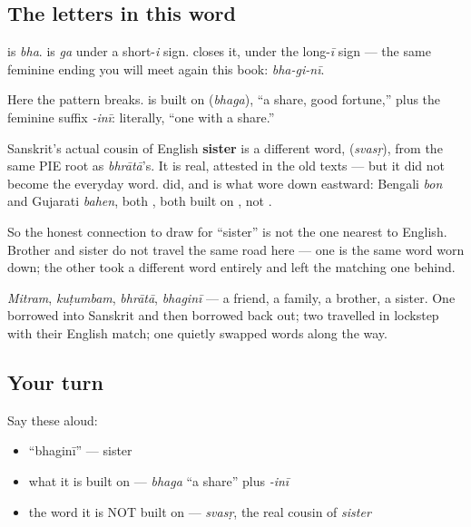 \subsection*{The letters in this word}
\textbf{} is \emph{bha}. \textbf{} is \textbf{} \emph{ga} under a short-\emph{i} sign. \textbf{} closes it, \textbf{} under the long-\emph{ī} sign — the same feminine ending you will meet again this book: \emph{bha-gi-nī}.

\begin{cousinweb}
Here the pattern breaks.  is built on \textbf{} (\emph{bhaga}), \textquotedblleft{}a share, good fortune,\textquotedblright{} plus the feminine suffix \emph{-inī}: literally, \textquotedblleft{}one with a share.\textquotedblright{}

Sanskrit's actual cousin of English \textbf{sister} is a different word, \textbf{} (\emph{svasṛ}), from the same PIE root as \emph{bhrātā}'s. It is real, attested in the old texts — but it did not become the everyday word.  did, and  is what wore down eastward: Bengali \emph{bon} and Gujarati \emph{bahen}, both , both built on , not .

So the honest connection to draw for \textquotedblleft{}sister\textquotedblright{} is not the one nearest to English. Brother and sister do not travel the same road here — one is the same word worn down; the other took a different word entirely and left the matching one behind.
\end{cousinweb}

\begin{grammarlens}[title={What you've built: four people}]
\emph{Mitram}, \emph{kuṭumbam}, \emph{bhrātā}, \emph{bhaginī} — a friend, a family, a brother, a sister. One borrowed into Sanskrit and then borrowed back out; two travelled in lockstep with their English match; one quietly swapped words along the way.
\end{grammarlens}

\subsection*{Your turn}
Say these aloud:

\begin{itemize}
\raggedright
  \item \textquotedblleft{}bhaginī\textquotedblright{} — sister
  \item what it is built on — \emph{bhaga} \textquotedblleft{}a share\textquotedblright{} plus \emph{-inī}
  \item the word it is NOT built on — \emph{svasṛ}, the real cousin of \emph{sister}
\end{itemize}

